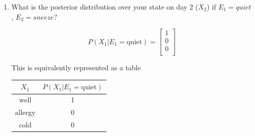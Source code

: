 \documentclass[12pt]{article}
\begin{document}
\begin{enumerate}

\item What is the posterior distribution over your state on day 2
  ($X_2$) if $E_1 = quiet$, $E_2 = sneeze$?

  \[
    P(X_1|E_1=\text{quiet}) = 
    \begin{bmatrix}
      1 \\
      0 \\
      0 \\
    \end{bmatrix}
  \]

  This is equivalently represented as a table

  \begin{center}
    \begin{tabular}{|c|c|}
      \hline
      $X_1$ & $P(X_1|E_1=\text{quiet})$ \\
      \hline
      $\text{well}$ & 1 \\
      \hline
      $\text{allergy}$ & 0 \\
      \hline
      $\text{cold}$ & 0 \\
      \hline
    \end{tabular}
  \end{center}


\end{enumerate}
\end{document}
